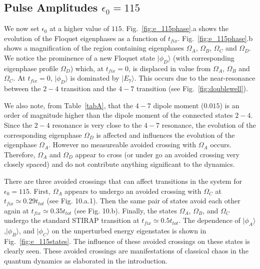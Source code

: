 \documentclass{article}
\begin{document}
%
%
\subsection{Pulse Amplitudes $\epsilon_0 = 115$}
%
%

We now  set $\epsilon_0$ at a higher value of $115$.  Fig.~\ref{fig:e_115phase}.a   shows the evolution of the Floquet eigenphases as a function of $t_{fix}$. Fig.~\ref{fig:e_115phase}.b shows a magnification of the region containing eigenphases $\Omega_A$, $\Omega_B$, $\Omega_C$ and $\Omega_D$. We notice the prominence of a new Floquet state $\vert\phi_D\rangle$ (with corresponding eigenphase profile $\Omega_D$)  which,  at $t_{fix}=0$, is displaced in value from  $\Omega_A$, $\Omega_B$ and $\Omega_C$.  At $t_{fix}=0$, $\vert\phi_D\rangle$ is dominated by $\vert E_7\rangle$. This occurs due to the near-resonance between the $2-4$ transition and the $4-7$ transition (see Fig.~\ref{fig:doublewell}).

We also note, from Table~\ref{tabA}, that the $4-7$ dipole moment ($0.015$) is an order of magnitude higher than the dipole moment of the connected states $2-4$. Since the $2-4$ resonance is very close to the $4-7$ resonance, the evolution of the corresponding eigenphase $\Omega_D$ is affected and influences the evolution of the eigenphase $\Omega_A$. However no measureable avoided crossing with $\Omega_A$ occurs. Therefore,  $\Omega_A$ and $\Omega_D$ appear to cross (or under go an avoided crossing very closely spaced) and do not contribute anything significant to the dynamics. 

There are three avoided crossings that can affect transitions in the system for ${\epsilon}_0=115$.  First,  $\Omega_A$ appears  to undergo an avoided crossing with $\Omega_C$ at $t_{fix}\simeq 0.29 t_{tot}$ 
(see Fig. 10.a.1). Then the same pair of states avoid each other again at  $t_{fix}\simeq 0.35 t_{tot}$ (see Fig. 10.b). Finally, the states $\Omega_A$, $\Omega_B$, and $\Omega_C$ undergo the standard STIRAP transition at $t_{fix}\simeq 0.5 t_{tot}$.  The dependence of $\vert\phi_A\rangle$,$\vert\phi_B\rangle$, and $\vert\phi_C\rangle$ on the unperturbed energy eigenstates is shown in Fig.~\ref{fig:e_115states}.  The influence of these avoided crossings on these states is clearly seen. These avoided crossings are manifestations of classical chaos in the quantum dynamics as elaborated in the introduction.
\end{document}
